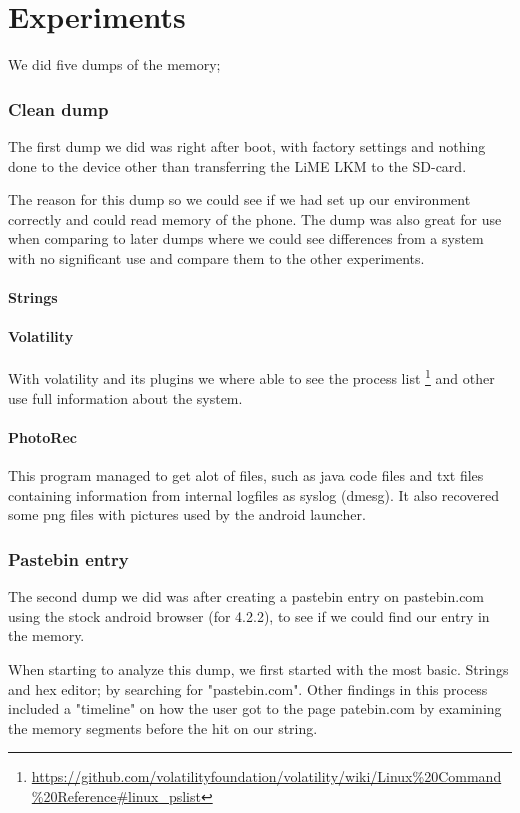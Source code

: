 \section{Experiments}
We did five dumps of the memory;
  \subsubsection{Clean dump}
  The first dump we did was right after boot, with factory settings and nothing done to the device 
  other than transferring the LiME LKM to the SD-card.
  
    The reason for this dump so we could see if we had set up our environment 
correctly and could read memory of the phone. The dump was also great for use 
when comparing to later dumps where we could see differences from a system with 
no significant use and compare them to the other experiments.

  \paragraph{Strings}

  \paragraph{Volatility}
  With volatility and its plugins we where able to see the process list
  \footnote{\url{https://github.com/volatilityfoundation/volatility/wiki/Linux\%20Command\%20Reference\#linux\_pslist}} 
  and other use full information about the system.

  \paragraph{PhotoRec}
  This program managed to get alot of files, such as java code files and txt 
  files containing information from internal logfiles as syslog (dmesg). It also 
  recovered some png files with pictures used by the android launcher.
  
  \subsubsection{Pastebin entry}
  The second dump we did was after creating a pastebin entry on pastebin.com using 
  the stock android browser (for 4.2.2),
  to see if we could find our entry in the memory.
  
  
  When starting to analyze this dump, we first started with the most basic. 
  Strings and hex editor; by searching for "pastebin.com". Other findings in this 
  process included a "timeline" on how the user got to the page patebin.com by 
  examining the memory segments before the hit on our string.

